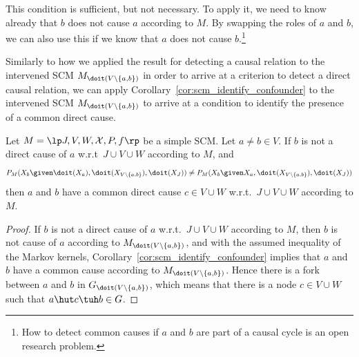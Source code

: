 This condition is sufficient, but not necessary.
To apply it, we need to know already that $b$ does not cause $a$ according to $M$. By
swapping the roles of $a$ and $b$, we can also use this if we know that $a$ does not cause $b$.\footnote{How to detect common causes if $a$ and $b$ are part of a causal cycle is an open research problem.}

Similarly to how we applied the result for detecting a causal relation to the intervened
SCM $M_{\doit(V\setminus \{a,b\})}$ in order to arrive at a criterion to detect a direct causal relation,
we can apply Corollary~\ref{cor:scm_identify_confounder} to the intervened SCM $M_{\doit(V\setminus \{a,b\})}$
to arrive at a condition to identify the presence of a common direct cause.
\begin{Cor}\label{cor:scm_identify_latent_confounder}
Let $M = \lt \Sin, \Send, \Srnd, \CX, P, f \rt$ be a simple SCM.
Let $a \ne b \in V$.
If $b$ is not a direct cause of $a$ w.r.t\ $J \cup V \cup W$ according to $M$, and
  $$P_{M}(X_b \given \doit(X_a), \doit(X_{V\setminus\{a,b\}}), \doit(X_J)) \ne P_{M}(X_b \given X_a, \doit(X_{V\setminus\{a,b\}}), \doit(X_J))$$
then $a$ and $b$ have a common direct cause $c \in V \cup W$ w.r.t.\ $J \cup V \cup W$ according to $M$.
\end{Cor}
\begin{proof}
If $b$ is not a direct cause of $a$ w.r.t.\ $J \cup V \cup W$ according to $M$, then
  $b$ is not cause of $a$ according to $M_{\doit(V\setminus\{a,b\})}$,
and with the assumed inequality of the Markov kernels,
Corollary~\ref{cor:scm_identify_confounder} implies that
$a$ and $b$ have a common cause according to $M_{\doit(V\setminus\{a,b\})}$.
Hence there is a fork between $a$ and $b$ in $G_{\doit(V\setminus\{a,b\})}$,
which means that there is a node $c \in V \cup W$ such that $a \hut c \tuh b \in G$.
\end{proof}

